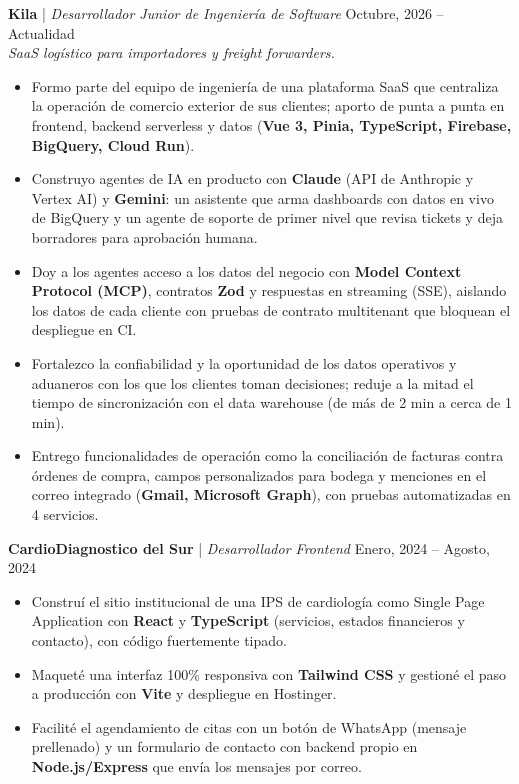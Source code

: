 \documentclass[11pt,a4paper]{article}
\begin{document}
\noindent
\textbf{Kila} | \textit{Desarrollador Junior de Ingeniería de Software} \hfill Octubre, 2026 – Actualidad \\
\textit{SaaS logístico para importadores y freight forwarders.}
\begin{itemize}[leftmargin=*, noitemsep, topsep=2pt]
    \item Formo parte del equipo de ingeniería de una plataforma SaaS que centraliza la operación de comercio exterior de sus clientes; aporto de punta a punta en frontend, backend serverless y datos (\textbf{Vue 3, Pinia, TypeScript, Firebase, BigQuery, Cloud Run}).
    \item Construyo agentes de IA en producto con \textbf{Claude} (API de Anthropic y Vertex AI) y \textbf{Gemini}: un asistente que arma dashboards con datos en vivo de BigQuery y un agente de soporte de primer nivel que revisa tickets y deja borradores para aprobación humana.
    \item Doy a los agentes acceso a los datos del negocio con \textbf{Model Context Protocol (MCP)}, contratos \textbf{Zod} y respuestas en streaming (SSE), aislando los datos de cada cliente con pruebas de contrato multitenant que bloquean el despliegue en CI.
    \item Fortalezco la confiabilidad y la oportunidad de los datos operativos y aduaneros con los que los clientes toman decisiones; reduje a la mitad el tiempo de sincronización con el data warehouse (de más de 2 min a cerca de 1 min).
    \item Entrego funcionalidades de operación como la conciliación de facturas contra órdenes de compra, campos personalizados para bodega y menciones en el correo integrado (\textbf{Gmail, Microsoft Graph}), con pruebas automatizadas en 4 servicios.
\end{itemize}

\vspace{0.2cm}

\noindent
\textbf{CardioDiagnostico del Sur} | \textit{Desarrollador Frontend} \hfill Enero, 2024 – Agosto, 2024
\begin{itemize}[leftmargin=*, noitemsep, topsep=2pt]
    \item Construí el sitio institucional de una IPS de cardiología como Single Page Application con \textbf{React} y \textbf{TypeScript} (servicios, estados financieros y contacto), con código fuertemente tipado.
    \item Maqueté una interfaz 100\% responsiva con \textbf{Tailwind CSS} y gestioné el paso a producción con \textbf{Vite} y despliegue en Hostinger.
    \item Facilité el agendamiento de citas con un botón de WhatsApp (mensaje prellenado) y un formulario de contacto con backend propio en \textbf{Node.js/Express} que envía los mensajes por correo.
\end{itemize}
\end{document}
